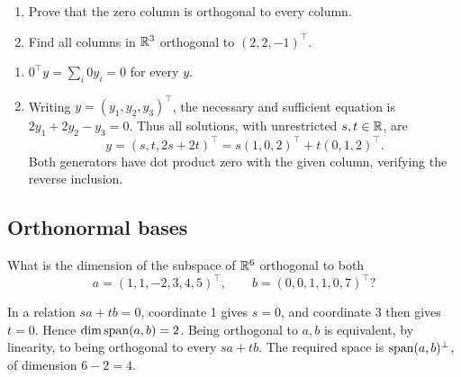 \begin{problem}\label{ex:06:orthogonal-r3}
\begin{enumerate}
\item Prove that the zero column is orthogonal to every column.
\item Find all columns in \(\mathbb R^3\) orthogonal to \((2,2,-1)^\top\).
\end{enumerate}
\end{problem}
\begin{solution}
\begin{enumerate}
\item \(0^\top y=\sum_i0y_i=0\) for every \(y\).
\item Writing \(y=(y_1,y_2,y_3)^\top\), the necessary and sufficient
equation is \(2y_1+2y_2-y_3=0\). Thus all solutions, with unrestricted
\(s,t\in\mathbb R\), are
\[
y=(s,t,2s+2t)^\top=s(1,0,2)^\top+t(0,1,2)^\top.
\]
Both generators have dot product zero with the given column, verifying
the reverse inclusion.
\end{enumerate}
\end{solution}

\subsection*{Orthonormal bases}

\begin{problem}\label{ex:06:complement-dimension}
What is the dimension of the subspace of \(\mathbb R^6\) orthogonal to both
\[
a=(1,1,-2,3,4,5)^\top,\qquad b=(0,0,1,1,0,7)^\top?
\]
\end{problem}
\begin{solution}
In a relation \(sa+tb=0\), coordinate 1 gives \(s=0\), and coordinate 3
then gives \(t=0\). Hence \(\dim\operatorname{span}(a,b)=2\).
Being orthogonal to \(a,b\) is equivalent, by linearity, to being
orthogonal to every \(sa+tb\).
The required space is \(\operatorname{span}(a,b)^\perp\), of dimension \(6-2=4\).
\end{solution}

